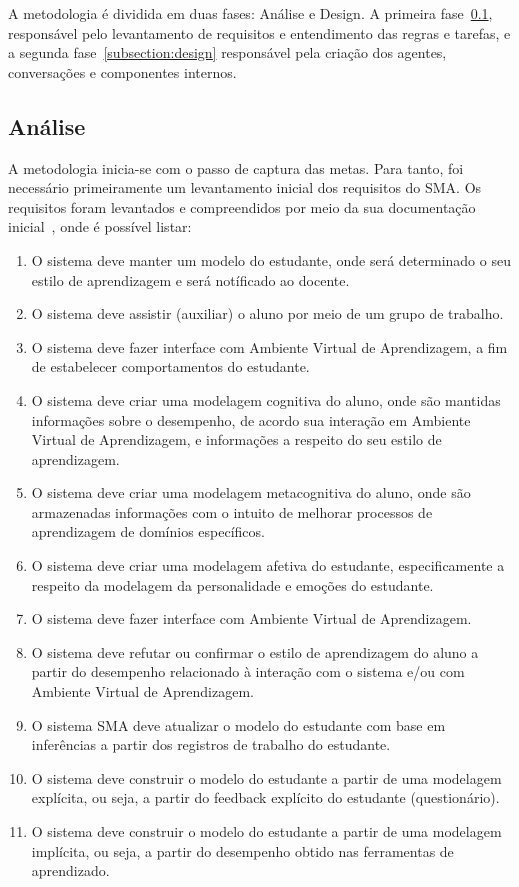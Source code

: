 A metodologia é dividida em duas fases: Análise e Design. A primeira fase~\ref{subsection:analise}, responsável pelo levantamento de requisitos e entendimento das regras e tarefas, e a segunda fase~\ref{subsection:design} responsável pela criação dos agentes, conversações e componentes internos.

\subsection{Análise}\label{subsection:analise}

A metodologia inicia-se com o passo de captura das metas. Para tanto, foi necessário primeiramente um levantamento inicial dos requisitos do SMA. Os requisitos foram levantados e compreendidos por meio da sua documentação inicial~\cite{editalFrank}, onde é possível listar:

\begin{enumerate}
	\item O sistema deve manter um modelo do estudante, onde será determinado o seu estilo de aprendizagem e será notíficado ao docente.
	\item O sistema deve assistir (auxiliar) o aluno por meio de um grupo de trabalho.
	\item O sistema deve fazer interface com Ambiente Virtual de Aprendizagem, a fim de estabelecer comportamentos do estudante.
	\item O sistema deve criar uma modelagem cognitiva do aluno, onde são mantidas informações sobre o desempenho, de acordo sua interação em Ambiente Virtual de Aprendizagem, e informações a respeito do seu estilo de aprendizagem.
	\item O sistema deve criar uma modelagem metacognitiva do aluno, onde são armazenadas informações com o intuito de melhorar processos de aprendizagem de domínios específicos.
	\item O sistema deve criar uma modelagem afetiva do estudante, especificamente a respeito da modelagem da personalidade e emoções do estudante.
	\item O sistema deve fazer interface com Ambiente Virtual de Aprendizagem.
	\item O sistema deve refutar ou confirmar o estilo de aprendizagem do aluno a partir do desempenho relacionado à interação com o sistema e/ou com Ambiente Virtual de Aprendizagem.
	\item O sistema SMA deve atualizar o modelo do estudante com base em inferências a partir dos registros de trabalho do estudante.
	\item O sistema deve construir o modelo do estudante a partir de uma modelagem explícita, ou seja, a partir do feedback explícito do estudante (questionário).
	\item O sistema deve construir o modelo do estudante a partir de uma modelagem implícita, ou seja, a partir do desempenho obtido nas ferramentas de aprendizado.
\end{enumerate}

